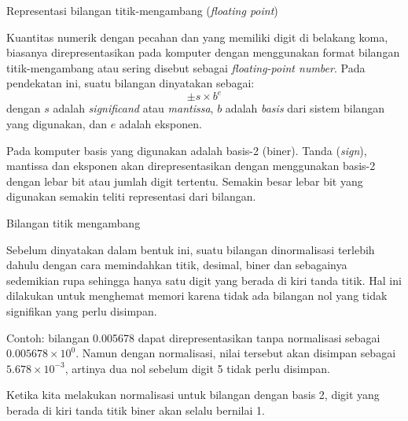\begin{frame}{Representasi bilangan titik-mengambang (\textit{floating point})}

Kuantitas numerik dengan pecahan dan yang memiliki digit di belakang koma,
biasanya direpresentasikan
pada komputer dengan menggunakan format bilangan titik-mengambang atau sering disebut sebagai
\textit{floating-point number}. Pada pendekatan ini, suatu bilangan dinyatakan sebagai:
\begin{equation*}
\pm s \times b^{e}
\end{equation*}
dengan $s$ adalah \emph{significand} atau \emph{mantissa}, $b$ adalah \emph{basis} dari sistem
bilangan yang digunakan, dan $e$ adalah eksponen.

Pada komputer basis yang digunakan adalah basis-2 (biner). Tanda (\textit{sign}),
mantissa dan eksponen akan direpresentasikan dengan menggunakan basis-2 dengan
lebar bit atau jumlah digit tertentu. Semakin besar lebar bit yang digunakan semakin teliti
representasi dari bilangan.

\end{frame}


\begin{frame}{Bilangan titik mengambang}

Sebelum dinyatakan dalam bentuk ini, suatu bilangan dinormalisasi terlebih dahulu dengan cara
memindahkan titik, desimal, biner dan sebagainya sedemikian rupa sehingga hanya satu digit
yang berada di kiri tanda titik. Hal ini dilakukan untuk menghemat memori karena tidak ada
bilangan nol yang tidak signifikan yang perlu disimpan.

Contoh: bilangan 0.005678 dapat direpresentasikan tanpa normalisasi sebagai
$0.005678 \times 10^{0}$. Namun dengan normalisasi, nilai tersebut akan disimpan
sebagai $5.678 \times 10^{-3}$, artinya dua nol sebelum digit 5 tidak perlu disimpan.

Ketika kita melakukan normalisasi untuk bilangan dengan basis 2, digit yang berada di kiri tanda
titik biner akan selalu bernilai 1.

\end{frame}


